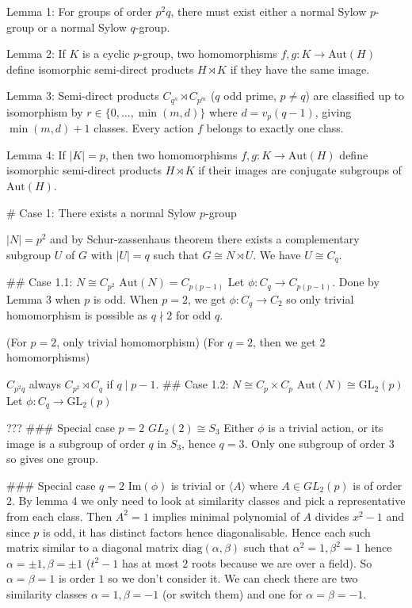 Lemma 1: For groups of order $p^2 q$, there must exist either a normal Sylow $p$-group or a normal Sylow $q$-group.

Lemma 2: If $K$ is a cyclic $p$-group, two homomorphisms $f, g : K → \text{Aut}(H)$ define
isomorphic semi-direct products $H \rtimes K$ if they have the same image.

Lemma 3: Semi-direct products $C_{q^n} ⋊ C_{p^m}$ ($q$ odd prime, $p ≠ q$) are classified up to
isomorphism by $r ∈ \{0, …, \min(m, d)\}$ where $d = v_p(q - 1)$, giving $\min(m, d) + 1$ classes. Every action $f$ belongs to exactly one class.

Lemma 4: If $|K| = p$, then two homomorphisms $f, g : K → \text{Aut}(H)$ define isomorphic semi-direct products $H \rtimes K$ if their images are conjugate subgroups of $\text{Aut}(H)$.

# Case 1: There exists a normal Sylow $p$-group

$|N| = p^2$ and by Schur-zassenhaus theorem there exists a complementary subgroup $U$ of $G$ with $|U| = q$ such that $G \cong N \rtimes U$. We have $U \cong C_q$.

## Case 1.1: $N \cong C_{p^2}$
$\text{Aut}(N) = C_{p(p-1)}$
Let $\phi : C_q \rightarrow C_{p(p-1)}$. Done by Lemma 3 when $p$ is odd. When $p = 2$, we get $\phi : C_q \rightarrow C_2$ so only trivial homomorphism is possible as $q \nmid 2$ for odd $q$.

(For $p = 2$, only trivial homomorphism)
(For $q = 2$, then we get 2 homomorphisms)

$C_{p^2 q}$ always
$C_{p^2} \rtimes C_q$ if $q \mid p - 1$.
## Case 1.2: $N \cong C_p \times C_p$
$\text{Aut}(N) \cong \text{GL}_2(p)$
Let $\phi : C_q \rightarrow \text{GL}_2(p)$

???
### Special case $p = 2$
$GL_2(2) \cong S_3$
Either $\phi$ is a trivial action, or its image is a subgroup of order $q$ in $S_3$, hence $q = 3$. Only one subgroup of order $3$ so gives one group.

### Special case $q = 2$
$\text{Im}(\phi)$ is trivial or $\langle A \rangle$ where $A \in GL_2(p)$ is of order $2$. By lemma 4 we only need to look at similarity classes and pick a representative from each class. Then $A^2 = 1$ implies minimal polynomial of $A$ divides $x^2 - 1$ and since $p$ is odd, it has distinct factors hence diagonalisable. Hence each such matrix similar to a diagonal matrix $\text{diag}(\alpha, \beta)$ such that $\alpha^2 = 1, \beta^2 = 1$ hence $\alpha = \pm 1, \beta = \pm 1$ ($t^2 - 1$ has at most $2$ roots because we are over a field). So $\alpha = \beta = 1$ is order $1$ so we don't consider it. We can check there are two similarity classes $\alpha = 1, \beta = -1$ (or switch them) and one for $\alpha = \beta = -1$.

